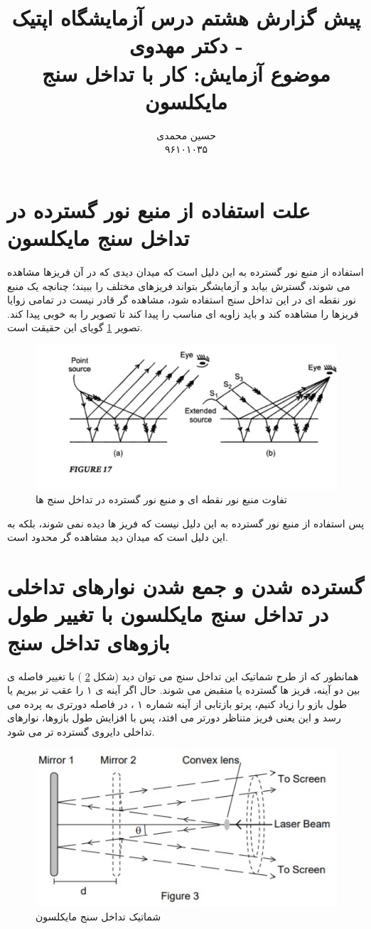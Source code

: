 \documentclass{article}
\title{	
	پیش گزارش هشتم درس آزمایشگاه اپتیک - دکتر مهدوی
	\\
	\small
	موضوع آزمايش: کار با تداخل سنج مایکلسون
}
\author{
حسین محمدی 
\\
۹۶۱۰۱۰۳۵
}
\begin{document}
\maketitle
\section{علت استفاده از منبع نور گسترده در تداخل سنج مایکلسون}
استفاده از منبع نور گسترده به این دلیل است که میدان دیدی که در آن فریزها مشاهده می شوند، گسترش بیابد و آزمایشگر بتواند فریزهای مختلف را ببیند؛ چنانچه یک منبع نور نقطه ای در این تداخل سنج استفاده شود، مشاهده گر قادر نیست در تمامی زوایا فریزها را مشاهده کند و باید زاویه ای مناسب را پیدا کند تا تصویر را به خوبی پیدا کند. تصویر 
\ref{Fig1}
گویای این حقیقت است.
\begin{figure}[h]
	\centering
	\includegraphics[scale=0.6]{1.jpg}
	\caption{تفاوت منبع نور نقطه ای و منبع نور گسترده در تداخل سنج ها}
	\label{Fig1}
\end{figure}

\noindent
پس استفاده از منبع نور گسترده به این دلیل نیست که فریز ها دیده نمی شوند، بلکه به این دلیل است که میدان دید مشاهده گر محدود است.
\section{ گسترده شدن و جمع شدن نوارهای تداخلی در تداخل سنج مایکلسون با تغییر طول بازوهای تداخل سنج
}
همانطور که از طرح شماتیک این تداخل سنج می توان دید (شکل 
\ref{Fig2}
)
با تغییر فاصله ی بین دو آینه، فریز ها گسترده یا منقبض می شوند. حال اگر آینه ی ۱ را عقب تر ببریم یا طول بازو را زیاد کنیم، پرتو بازتابی از آینه شماره ۱ ، در فاصله دورتری به پرده 
 می رسد و این یعنی فریز متناظر دورتر می افتد، پس با افزایش طول بازوها، نوارهای تداخلی دایروی گسترده تر می شود.
\begin{figure}[h]
	\centering
	\includegraphics[scale=0.85]{2.jpg}
	\caption{شماتیک تداخل سنج مایکلسون}
	\label{Fig2}
	\end{figure}
\end{document}

